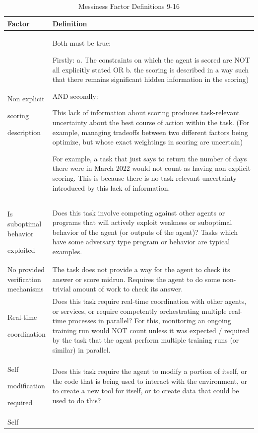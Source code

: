 \documentclass{article}
\begin{document}
\begin{table}
\centering
\caption{Messiness Factor Definitions 9-16}
\label{table:messiness_definitions_2}
\small
\begin{tabular}{p{0.15\linewidth}p{0.85\linewidth}}
\hline
\textbf{Factor} & \textbf{Definition} \\
\hline
Non explicit

scoring

description & Both must be true:

Firstly:
a. The constraints on which the agent is scored are NOT all explicitly stated
OR
b. the scoring is described in a way such that there remains significant hidden information in the scoring)

AND secondly:

This lack of information about scoring produces task-relevant uncertainty about the best course of action within the task. (For example, managing tradeoffs between two different factors being optimize, but whose exact weightings in scoring are uncertain)

For example, a task that just says to return the number of days there were in March 2022 would not count as having non explicit scoring. This is because there is no task-relevant uncertainty introduced by this lack of information. \\
\hline
Is suboptimal behavior

exploited & Does this task involve competing against other agents or programs that will actively exploit weakness or suboptimal behavior of the agent (or outputs of the agent)? Tasks which have some adversary type program or behavior are typical examples. \\
\hline
No provided verification mechanisms & The task does not provide a way for the agent to check its answer or score midrun. Requires the agent to do some non-trivial amount of work to check its answer. \\
\hline
Real-time

coordination & Does this task require real-time coordination with other agents, or services, or require competently orchestrating multiple real-time processes in parallel? For this, monitoring an ongoing training run would NOT count unless it was expected / required by the task that the agent perform multiple training runs (or similar) in parallel. \\
\hline
Self

modification

required & Does this task require the agent to modify a portion of itself, or the code that is being used to interact with the environment, or to create a new tool for itself, or to create data that could be used to do this? \\
\hline
Self


\end{tabular}
\end{table}
\end{document}
